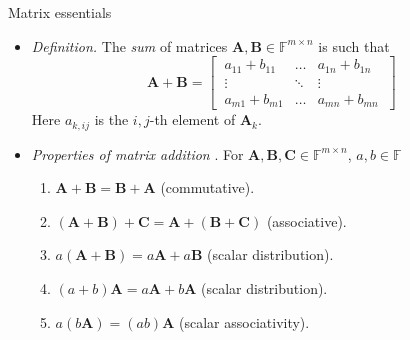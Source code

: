 \documentclass{beamer}
\numberwithin{equation}{section}
\begin{document}
\begin{frame}{Matrix essentials}
    \begin{itemize}
        \item
        \textit{Definition.} The \textit{sum} of matrices 
        $ \mathbf{A}, \mathbf{B} \in \mathbb{F}^{m \times n }$ is such that
        \begin{equation*}
            \mathbf{A} + \mathbf{B} = \begin{bmatrix}
                \ a_{11} + b_{11} & \ldots & a_{1n} + b_{1n} \ \\
                \ \vdots & \ddots & \vdots \ \\
                \ a_{m1} + b_{m1} & \ldots & a_{mn} + b_{mn} \
            \end{bmatrix}
        \end{equation*}
        Here $ a_{k, ij} $ is the $ i, j $-th element of $ \mathbf{A}_k $.

        \item
        \textit{Properties of matrix addition} \cite{jacob_linalg}. For
        $ \mathbf{A}, \mathbf{B}, \mathbf{C} \in \mathbb{F}^{m \times n} $,
        $ a, b \in \mathbb{F} $
        \begin{enumerate}
            \item
            $ \mathbf{A} + \mathbf{B} = \mathbf{B} + \mathbf{A} $
            (commutative).

            \item
            $ (\mathbf{A} + \mathbf{B}) + \mathbf{C} = \mathbf{A} +
            (\mathbf{B} + \mathbf{C}) $ (associative).

            \item
            $ a(\mathbf{A} + \mathbf{B}) = a\mathbf{A} + a\mathbf{B} $ (scalar
            distribution).

            \item
            $ (a + b)\mathbf{A} = a\mathbf{A} + b\mathbf{A} $ (scalar
            distribution).

            \item
            $ a(b\mathbf{A}) = (ab)\mathbf{A} $ (scalar associativity).
        \end{enumerate}
    \end{itemize}
\end{frame}
\end{document}
